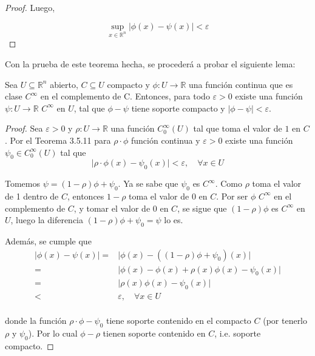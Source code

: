 \documentclass[12pt]{report}
\theoremstyle{largebreak}
\newcommand\abs[1]{\ensuremath{\lvert#1\rvert}}
\newcommand\cf[3]{\ensuremath{#1:#2\rightarrow#3}}
\begin{document}
\begin{proof}
    Luego,
    
    \begin{equation*}
        \sup_{x\in\mathbb{R}^n}\abs{\phi(x)-\psi(x)}<\varepsilon
    \end{equation*}

\end{proof}

Con la prueba de este teorema hecha, se procederá a probar el siguiente lema:

\setcounter{section}{6}
\setcounter{lema}{14}

\begin{lema}
    Sea $U\subseteq\mathbb{R}^n$ abierto, $C\subseteq U$ compacto y $\cf{\phi}{U}{\mathbb{R}}$ una función continua que es clase $C^{\infty}$ en el complemento de C. Entonces, para todo $\varepsilon > 0$ existe una función $\cf{\psi}{U}{\mathbb{R}}$ $C^{\infty}$ en $U$, tal que $\phi - \psi$ tiene soporte compacto y $\abs{\phi - \psi}<\varepsilon$.
\end{lema}

\begin{proof}
    Sea $\varepsilon>0$ y $\cf{\rho}{U}{\mathbb{R}}$ una función $C_0^{\infty}(U)$ tal que toma el valor de $1$ en $C$. Por el Teorema 3.5.11 para $\rho\cdot\phi$ función continua y $\varepsilon>0$ existe una función $\psi_0\in C^{\infty}_{0}(U)$ tal que
    \begin{equation*}
        \abs{\rho\cdot\phi(x)-\psi_0(x)}<\varepsilon,\quad\forall x\in U
    \end{equation*}

    Tomemos $\psi=\left(1-\rho\right)\phi+\psi_0$. Ya se sabe que $\psi_0$ es $C^\infty$. Como $\rho$ toma el valor de 1 dentro de $C$, entonces $1-\rho$ toma el valor de $0$ en $C$. Por ser $\phi$ $C^\infty$ en el complemento de $C$, y tomar el valor de $0$ en $C$, se sigue que $\left(1-\rho\right)\phi$ es $C^\infty$ en $U$, luego la diferencia $\left(1-\rho\right)\phi+\psi_0=\psi$ lo es.

    Además, se cumple que
    \begin{equation*}
        \begin{split}
            \abs{\phi(x)-\psi(x)}=&\abs{\phi(x)-\left(\left(1-\rho\right)\phi+\psi_0\right)(x)}\\
            =&\abs{\phi(x)-\phi(x)+\rho(x)\phi(x)-\psi_0(x)}\\
            =&\abs{\rho(x)\phi(x)-\psi_0(x)}\\
            <&\varepsilon,\quad\forall x\in U\\
        \end{split}
    \end{equation*}
    
    donde la función $\rho\cdot\phi-\psi_0$ tiene soporte contenido en el compacto $C$ (por tenerlo $\rho$ y $\psi_0$). Por lo cual $\phi-\rho$ tienen soporte contenido en $C$, i.e. soporte compacto. 
\end{proof}
\end{document}

